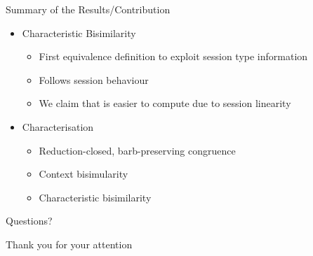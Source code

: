 \documentclass{beamer}
\begin{document}
	\begin{frame}{Summary of the Results/Contribution}
		\begin{itemize}
			\item	Characteristic Bisimilarity
				\begin{itemize}
					\item	First equivalence definition to exploit session type information
					\item	Follows session behaviour
					\item	We claim that is easier to compute due to session linearity
				\end{itemize}

			\item	Characterisation
				\begin{itemize}
					\item	Reduction-closed, barb-preserving congruence
					\item	Context bisimularity
					\item	Characteristic bisimilarity
				\end{itemize}

		\end{itemize}
	\end{frame}

	\begin{frame}{Questions?}
		\begin{center}
			\huge Thank you for your attention
		\end{center}
	\end{frame}
\end{document}
